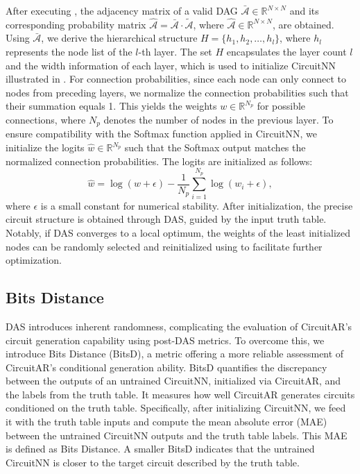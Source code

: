 After executing , the adjacency matrix of a valid DAG $\bar{\mathcal{A}} \in \mathbb{R}^{N \times N}$ and its corresponding probability matrix $\hat{\mathcal{A}} = \bar{\mathcal{A}} \cdot \tilde{\mathcal{A}}$, where $\hat{\mathcal{A}} \in \mathbb{R}^{N \times N}$, are obtained. 
Using $\bar{\mathcal{A}}$, we derive the hierarchical structure $H = \{h_1, h_2, \dots, h_l\}$, where $h_l$ represents the node list of the $l$-th layer. 
The set $H$ encapsulates the layer count $l$ and the width information of each layer, which is used to initialize CircuitNN illustrated in .
For connection probabilities, since each node can only connect to nodes from preceding layers, we normalize the connection probabilities such that their summation equals 1. 
This yields the weights $w \in \mathbb{R}^{N_{p}}$ for possible connections, where $N_{p}$ denotes the number of nodes in the previous layer. 
To ensure compatibility with the Softmax function applied in CircuitNN, we initialize the logits $\hat{w} \in \mathbb{R}^{N_{p}}$ such that the Softmax output matches the normalized connection probabilities. 
The logits are initialized as follows:
\begin{equation}
	\hat{w} = \log(w + \epsilon) - \frac{1}{N_{p}} \sum_{i=1}^{N_{p}} \log(w_i + \epsilon), 
\label{eq:init}
\end{equation} 
where $\epsilon$ is a small constant for numerical stability.
After initialization, the precise circuit structure is obtained through DAS, guided by the input truth table.
Notably, if DAS converges to a local optimum, the weights of the least initialized nodes can be randomly selected and reinitialized using  to facilitate further optimization.

\subsection{Bits Distance}

DAS introduces inherent randomness, complicating the evaluation of CircuitAR's circuit generation capability using post-DAS metrics. 
To overcome this, we introduce Bits Distance (BitsD), a metric offering a more reliable assessment of CircuitAR's conditional generation ability.
BitsD quantifies the discrepancy between the outputs of an untrained CircuitNN, initialized via CircuitAR, and the labels from the truth table. 
It measures how well CircuitAR generates circuits conditioned on the truth table. 
Specifically, after initializing CircuitNN, we feed it with the truth table inputs and compute the mean absolute error (MAE) between the untrained CircuitNN outputs and the truth table labels. 
This MAE is defined as Bits Distance.
A smaller BitsD indicates that the untrained CircuitNN is closer to the target circuit described by the truth table. 
